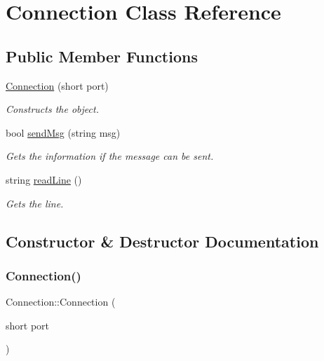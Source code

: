 \hypertarget{class_connection}{}\section{Connection Class Reference}
\label{class_connection}
\subsection*{Public Member Functions}
\begin{DoxyCompactItemize}
\item 
\mbox{\hyperlink{class_connection_a8089476d48ba545f44e691cd4bd0278d}{Connection}} (short port)
\begin{DoxyCompactList}\small\item\em Constructs the object. \end{DoxyCompactList}\item 
bool \mbox{\hyperlink{class_connection_a4b9f6db1fb42fc9857f829fa0bc52e6e}{send\+Msg}} (string msg)
\begin{DoxyCompactList}\small\item\em Gets the information if the message can be sent. \end{DoxyCompactList}\item 
string \mbox{\hyperlink{class_connection_a1df16b436751b686d96c24ca0c498659}{read\+Line}} ()
\begin{DoxyCompactList}\small\item\em Gets the line. \end{DoxyCompactList}\end{DoxyCompactItemize}


\subsection{Constructor \& Destructor Documentation}
\mbox{\label{class_connection_a8089476d48ba545f44e691cd4bd0278d}} 
\subsubsection{\texorpdfstring{Connection()}{Connection()}}
{\footnotesize\ttfamily Connection\+::\+Connection (\begin{DoxyParamCaption}\item[{short}]{port }\end{DoxyParamCaption})}



